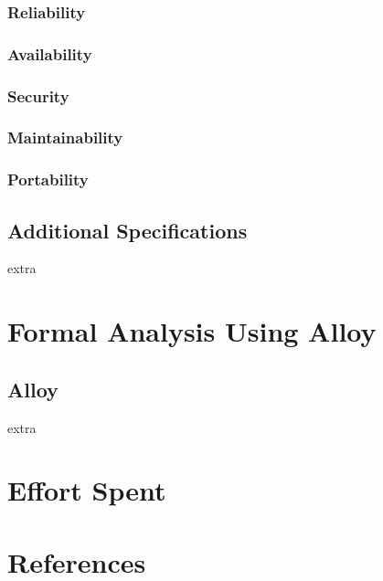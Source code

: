 \documentclass{article}
\begin{document}
		\subsubsection{Reliability}
		\subsubsection{Availability}
		\subsubsection{Security}
		\subsubsection{Maintainability}
		\subsubsection{Portability}
	\subsection{Additional Specifications}
	extra
	
	
\section{Formal Analysis Using Alloy}
	\subsection{Alloy}
	extra
	
	
\section{Effort Spent}

\section{References}	
	
	
	
\end{document}
